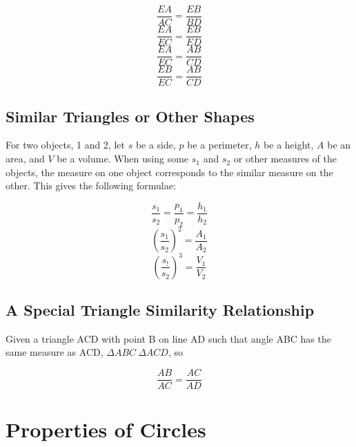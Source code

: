 \documentclass[final, letterpaper, 12pt]{article}
\begin{document}
		\begin{equation}
			\frac{EA}{AC} = \frac{EB}{BD}
		\end{equation}
		\begin{equation}
			\frac{EA}{EC} = \frac{EB}{ED}
		\end{equation}
		\begin{equation}
			\frac{EA}{EC} = \frac{AB}{CD}
		\end{equation}
		\begin{equation}
			\frac{EB}{EC} = \frac{AB}{CD}
		\end{equation}
	
	\subsection{Similar Triangles or Other Shapes}\label{sec: simple proportions between properties of various similar objects}
		For two objects, 1 and 2, let $s$ be a side, $p$ be a perimeter, $h$ be a height, $A$ be an area, and $V$ be a volume. When using some $s_1$ and $s_2$ or other measures of the objects, the measure on one object corresponds to the similar measure on the other. This gives the following formulae:
		
		\begin{equation}
			\frac{s_1}{s_2} = \frac{p_1}{p_2} = \frac{h_1}{h_2}
		\end{equation}
		\begin{equation}
			\left(\frac{s_1}{s_2}\right)^2 = \frac{A_1}{A_2}
		\end{equation}
		\begin{equation}
			\left(\frac{s_!}{s_2}\right)^3 = \frac{V_1}{V_2}
		\end{equation}
	
	\subsection{A Special Triangle Similarity Relationship}\label{sec: a common problem about similar triangles}
		Given a triangle ACD with point B on line AD such that angle ABC has the same measure as ACD, $\Delta ABC ~ \Delta ACD$, so
		
		\begin{equation}
			\frac{AB}{AC} = \frac{AC}{AD}
		\end{equation}
		
\section{Properties of Circles}
\end{document}
